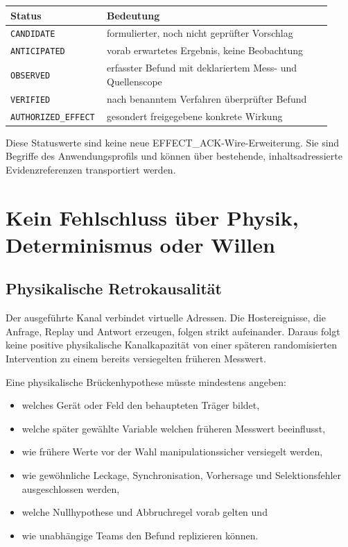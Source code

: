 \documentclass[11pt,a4paper]{article}
\theoremstyle{remark}
\begin{document}
\begin{longtable}{@{}L{0.24\linewidth}L{0.68\linewidth}@{}}
\toprule
\textbf{Status} & \textbf{Bedeutung} \\
\midrule
\endhead
\texttt{CANDIDATE} & formulierter, noch nicht geprüfter Vorschlag \\
\texttt{ANTICIPATED} & vorab erwartetes Ergebnis, keine Beobachtung \\
\texttt{OBSERVED} & erfasster Befund mit deklariertem Mess- und Quellenscope \\
\texttt{VERIFIED} & nach benanntem Verfahren überprüfter Befund \\
\texttt{AUTHORIZED\_EFFECT} & gesondert freigegebene konkrete Wirkung \\
\bottomrule
\end{longtable}

Diese Statuswerte sind keine neue EFFECT\_ACK-Wire-Erweiterung. Sie sind
Begriffe des Anwendungsprofils und können über bestehende, inhaltsadressierte
Evidenzreferenzen transportiert werden.

\section{Kein Fehlschluss über Physik, Determinismus oder Willen}

\subsection{Physikalische Retrokausalität}

Der ausgeführte Kanal verbindet virtuelle Adressen. Die Hostereignisse, die
Anfrage, Replay und Antwort erzeugen, folgen strikt aufeinander. Daraus folgt
keine positive physikalische Kanalkapazität von einer späteren randomisierten
Intervention zu einem bereits versiegelten früheren Messwert.

Eine physikalische Brückenhypothese müsste mindestens angeben:

\begin{itemize}
  \item welches Gerät oder Feld den behaupteten Träger bildet,
  \item welche später gewählte Variable welchen früheren Messwert beeinflusst,
  \item wie frühere Werte vor der Wahl manipulationssicher versiegelt werden,
  \item wie gewöhnliche Leckage, Synchronisation, Vorhersage und
    Selektionsfehler ausgeschlossen werden,
  \item welche Nullhypothese und Abbruchregel vorab gelten und
  \item wie unabhängige Teams den Befund replizieren können.
\end{itemize}
\end{document}
